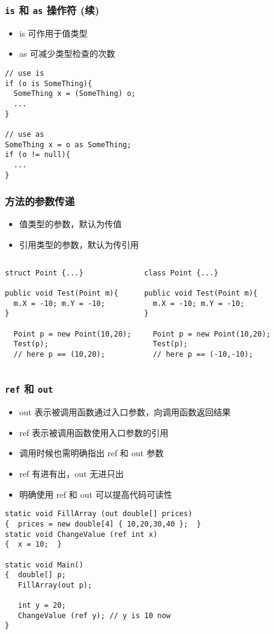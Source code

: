\begin{frame}[fragile]
\frametitle{\texttt{is} 和 \texttt{as} 操作符 (续)}
\begin{itemize}
\item is 可作用于值类型
\item as 可减少类型检查的次数
\end{itemize}
\begin{lstlisting}
// use is
if (o is SomeThing){
  SomeThing x = (SomeThing) o;
  ...
}

// use as
SomeThing x = o as SomeThing;
if (o != null){
  ...
}

\end{lstlisting}
\end{frame}

\begin{frame}[fragile]
\frametitle{方法的参数传递}
\begin{itemize}
\item 值类型的参数，默认为{\redwarn 传值}
\item 引用类型的参数，默认为{\redwarn 传引用}
\end{itemize}
\begin{columns}
\begin{lstlisting}
struct Point {...}

public void Test(Point m){
  m.X = -10; m.Y = -10;
}

  Point p = new Point(10,20);
  Test(p);
  // here p == (10,20);
\end{lstlisting}
\begin{lstlisting}
class Point {...}

public void Test(Point m){
  m.X = -10; m.Y = -10;
}

  Point p = new Point(10,20);
  Test(p);
  // here p == (-10,-10);
\end{lstlisting}
\end{columns}
\end{frame}

\begin{frame}[fragile]
\frametitle{\texttt{ref} 和 \texttt{out}}
\begin{itemize}
\item out 表示被调用函数通过入口参数，向调用函数返回结果
\item ref 表示被调用函数使用入口参数的引用
\item 调用时候也需明确指出 ref 和 out 参数
\item ref 有进有出，out 无进只出
\item 明确使用 ref 和 out 可以提高代码可读性
\end{itemize}
\begin{lstlisting}
static void FillArray (out double[] prices)
{  prices = new double[4] { 10,20,30,40 };  }
static void ChangeValue (ref int x)
{  x = 10;  }

static void Main()
{  double[] p;
   FillArray(out p);

   int y = 20;
   ChangeValue (ref y); // y is 10 now
}
\end{lstlisting}
\end{frame}


